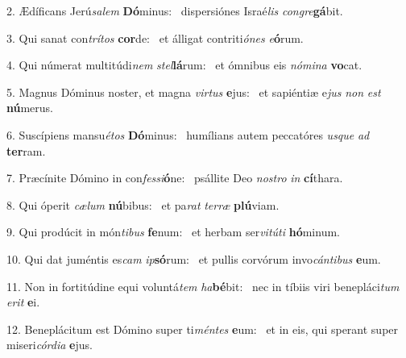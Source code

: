 2. Ædíficans Jerú\textit{sa}\textit{lem} \textbf{Dó}minus: \ast\  dispersiónes Israé\textit{lis} \textit{con}\textit{gre}\textbf{gá}bit.\

3. Qui sanat con\textit{trí}\textit{tos} \textbf{cor}de: \ast\  et álligat contriti\textit{ó}\textit{nes} \textit{e}\textbf{ó}rum.\

4. Qui númerat multitúdi\textit{nem} \textit{stel}\textbf{lá}rum: \ast\  et ómnibus eis \textit{nó}\textit{mi}\textit{na} \textbf{vo}cat.\

5. Magnus Dóminus noster, et magna \textit{vir}\textit{tus} \textbf{e}jus: \ast\  et sapiéntiæ e\textit{jus} \textit{non} \textit{est} \textbf{nú}merus.\

6. Suscípiens mansu\textit{é}\textit{tos} \textbf{Dó}minus: \ast\  humílians autem peccatóres \textit{us}\textit{que} \textit{ad} \textbf{ter}ram.\

7. Præcínite Dómino in con\textit{fes}\textit{si}\textbf{ó}ne: \ast\  psállite Deo \textit{nos}\textit{tro} \textit{in} \textbf{cí}thara.\

8. Qui óperit \textit{cæ}\textit{lum} \textbf{nú}bibus: \ast\  et pa\textit{rat} \textit{ter}\textit{ræ} \textbf{plú}viam.\

9. Qui prodúcit in món\textit{ti}\textit{bus} \textbf{fe}num: \ast\  et herbam ser\textit{vi}\textit{tú}\textit{ti} \textbf{hó}minum.\

10. Qui dat juméntis es\textit{cam} \textit{ip}\textbf{só}rum: \ast\  et pullis corvórum invo\textit{cán}\textit{ti}\textit{bus} \textbf{e}um.\

11. Non in fortitúdine equi voluntá\textit{tem} \textit{ha}\textbf{bé}bit: \ast\  nec in tíbiis viri benepláci\textit{tum} \textit{e}\textit{rit} \textbf{e}i.\

12. Beneplácitum est Dómino super ti\textit{mén}\textit{tes} \textbf{e}um: \ast\  et in eis, qui sperant super miseri\textit{cór}\textit{di}\textit{a} \textbf{e}jus.\

